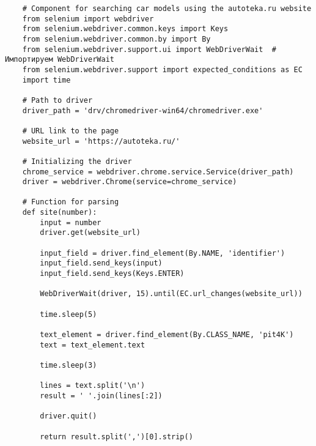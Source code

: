 \label{ax:authornote}



\label{ax:code}

\begin{lstlisting}
    # Component for searching car models using the autoteka.ru website 
    from selenium import webdriver
    from selenium.webdriver.common.keys import Keys
    from selenium.webdriver.common.by import By
    from selenium.webdriver.support.ui import WebDriverWait  # Импортируем WebDriverWait
    from selenium.webdriver.support import expected_conditions as EC
    import time

    # Path to driver
    driver_path = 'drv/chromedriver-win64/chromedriver.exe'

    # URL link to the page
    website_url = 'https://autoteka.ru/'

    # Initializing the driver
    chrome_service = webdriver.chrome.service.Service(driver_path)
    driver = webdriver.Chrome(service=chrome_service)

    # Function for parsing
    def site(number):
        input = number
        driver.get(website_url)

        input_field = driver.find_element(By.NAME, 'identifier')
        input_field.send_keys(input)
        input_field.send_keys(Keys.ENTER)

        WebDriverWait(driver, 15).until(EC.url_changes(website_url))

        time.sleep(5)

        text_element = driver.find_element(By.CLASS_NAME, 'pit4K')
        text = text_element.text

        time.sleep(3)

        lines = text.split('\n')
        result = ' '.join(lines[:2])

        driver.quit()

        return result.split(',')[0].strip()
\end{lstlisting}

